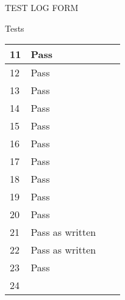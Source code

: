 \documentclass{article}
\begin{document}
\begin{section}{TEST LOG FORM}
\begin{subsection}{Tests}
\begin{tabularx}{\linewidth}{| p{1.5cm} | p{2cm} | p{9cm} | X |}
11
&
Pass
&

&

\\
\hline

12
&
Pass
&

&

\\
\hline

13
&
Pass 
&

&

\\
\hline

14
&
Pass
&

&

\\
\hline

15
&
Pass
&

&

\\
\hline

16
&
Pass
&

&

\\
\hline

17
&
Pass
&

&

\\
\hline

18
&
Pass
&

&

\\
\hline

19
&
Pass
&

&

\\
\hline

20
&
Pass
&

&

\\
\hline

21
&
Pass as written
&

&

\\
\hline

22
&
Pass as written
&

&

\\
\hline

23
&
Pass
&

&

\\
\hline

24
&

&

&

\\
\hline


\end{tabularx}
\end{subsection}
\end{section}
\end{document}
